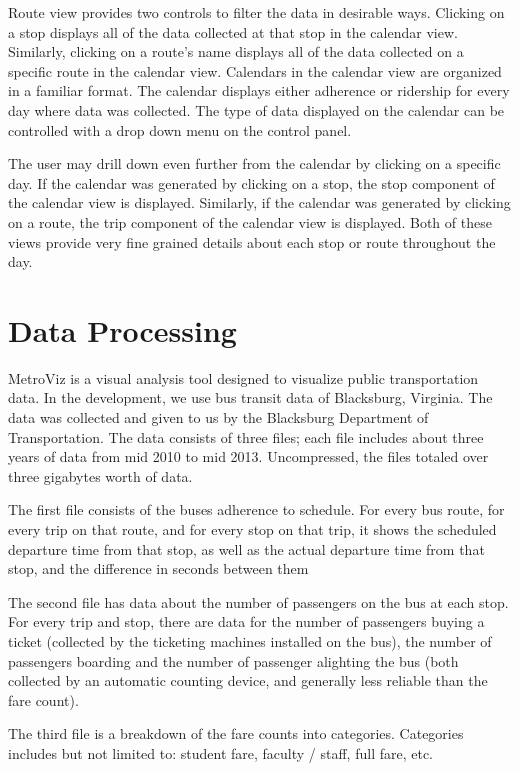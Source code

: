 \documentclass[journal]{vgtc}                %
\begin{document}
Route view provides two controls to filter the data in desirable ways. Clicking on a stop displays all of the data collected at that stop in the calendar view. Similarly, clicking on a route's name displays all of the data collected on a specific route in the calendar view. Calendars in the calendar view are organized in a familiar format. The calendar displays either adherence or ridership for every day where data was collected. The type of data displayed on the calendar can be controlled with a drop down menu on the control panel.

The user may drill down even further from the calendar by clicking on a specific day. If the calendar was generated by clicking on a stop, the stop component of the calendar view is displayed. Similarly, if the calendar was generated by clicking on a route, the trip component of the calendar view is displayed. Both of these views provide very fine grained details about each stop or route throughout the day.

\section{Data Processing}
MetroViz is a visual analysis tool designed to visualize public transportation data. In the development, we use bus transit data of Blacksburg, Virginia. The data was collected and given to us by the Blacksburg Department of Transportation. The data consists of three files; each file includes about three years of data from mid 2010 to mid 2013. Uncompressed, the files totaled over three gigabytes worth of data.

The first file consists of the buses adherence to schedule. For every bus route, for every trip on that route, and for every stop on that trip, it shows the scheduled departure time from that stop, as well as the actual departure time from that stop, and the difference in seconds between them

The second file has data about the number of passengers on the bus at each stop. For every trip and stop, there are data for the number of passengers buying a ticket (collected by the ticketing machines installed on the bus), the number of passengers boarding and the number of passenger alighting the bus (both collected by an automatic counting device, and generally less reliable than the fare count).

The third file is a breakdown of the fare counts into categories. Categories includes but not limited to: student fare, faculty / staff, full fare, etc.
\end{document}
